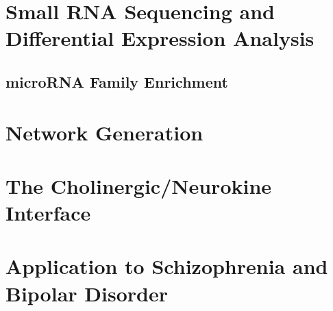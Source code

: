 \section{Small RNA Sequencing and Differential Expression Analysis}
\subsection{microRNA Family Enrichment}
\section{Network Generation}
\section{The Cholinergic/Neurokine Interface}
\section{Application to Schizophrenia and Bipolar Disorder}
